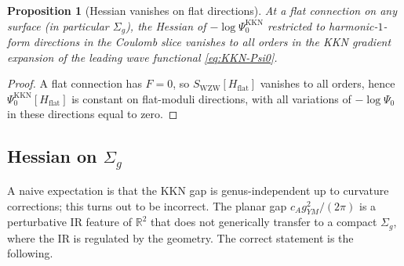 \documentclass[11pt,letterpaper]{article}
\newtheorem{proposition}[theorem]{Proposition}
\theoremstyle{definition}
\newcommand{\bbR}{\mathbb{R}}
\begin{document}
\begin{proposition}[Hessian vanishes on flat directions]\label{prop:KKN-flat}
At a flat connection on any surface (in particular $\Sigma_g$), the Hessian of $-\log\Psi_0^{\mathrm{KKN}}$ restricted to harmonic-$1$-form directions in the Coulomb slice vanishes to all orders in the KKN gradient expansion of the leading wave functional \eqref{eq:KKN-Psi0}.
\end{proposition}

\begin{proof}
A flat connection has $F = 0$, so $S_{\mathrm{WZW}}[H_{\mathrm{flat}}]$ vanishes to all orders, hence $\Psi_0^{\mathrm{KKN}}[H_{\mathrm{flat}}]$ is constant on flat-moduli directions, with all variations of $-\log\Psi_0$ in these directions equal to zero.
\end{proof}

\subsection{Hessian on $\Sigma_g$}\label{sec:KKN-curved-correction}

A naive expectation is that the KKN gap is genus-independent up to curvature corrections; this turns out to be incorrect. The planar gap $c_A g^2_{YM}/(2\pi)$ is a perturbative IR feature of $\bbR^2$ that does not generically transfer to a compact $\Sigma_g$, where the IR is regulated by the geometry. The correct statement is the following.
\end{document}
